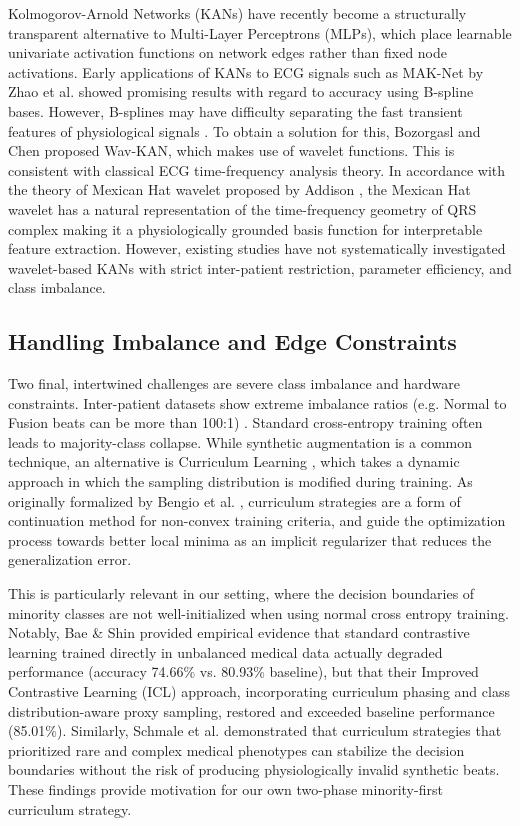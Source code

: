 \documentclass[final,5p,times,twocolumn,number]{elsarticle}
\begin{document}
Kolmogorov-Arnold Networks (KANs) \cite{liu_kan_2024} have recently become a structurally transparent alternative to Multi-Layer Perceptrons (MLPs), which place learnable univariate activation functions on network edges rather than fixed node activations. Early applications of KANs to ECG signals such as MAK-Net by Zhao et al. \cite{zhao_mak-net_2025} showed promising results with regard to accuracy using B-spline bases. However, B-splines may have difficulty separating the fast transient features of physiological signals \cite{bozorgasl_liu_2024}. To obtain a solution for this, Bozorgasl and Chen \cite{bozorgasl_liu_2024} proposed Wav-KAN, which makes use of wavelet functions. This is consistent with classical ECG time-frequency analysis theory. In accordance with the theory of Mexican Hat wavelet proposed by Addison \cite{addison_wavelet_2005}, the Mexican Hat wavelet has a natural representation of the time-frequency geometry of QRS complex making it a physiologically grounded basis function for interpretable feature extraction. However, existing studies have not systematically investigated wavelet-based KANs with strict inter-patient restriction, parameter efficiency, and class imbalance.

\subsection{Handling Imbalance and Edge Constraints}
Two final, intertwined challenges are severe class imbalance and hardware constraints. Inter-patient datasets show extreme imbalance ratios (e.g. Normal to Fusion beats can be more than 100:1) \cite{silva_systematic_2025}. Standard cross-entropy training often leads to majority-class collapse. While synthetic augmentation is a common technique, an alternative is Curriculum Learning \cite{bengio_curriculum_2009}, which takes a dynamic approach in which the sampling distribution is modified during training. As originally formalized by Bengio et al. \cite{bengio_curriculum_2009}, curriculum strategies are a form of continuation method for non-convex training criteria, and guide the optimization process towards better local minima as an implicit regularizer that reduces the generalization error.

This is particularly relevant in our setting, where the decision boundaries of minority classes are not well-initialized when using normal cross entropy training. Notably, Bae \& Shin \cite{bae_handling_2025} provided empirical evidence that standard contrastive learning trained directly in unbalanced medical data actually degraded performance (accuracy 74.66\% vs. 80.93\% baseline), but that their Improved Contrastive Learning (ICL) approach, incorporating curriculum phasing and class distribution-aware proxy sampling, restored and exceeded baseline performance (85.01\%). Similarly, Schmale et al. \cite{schmale_curriculum_2025} demonstrated that curriculum strategies that prioritized rare and complex medical phenotypes can stabilize the decision boundaries without the risk of producing physiologically invalid synthetic beats. These findings provide motivation for our own two-phase minority-first curriculum strategy.
\end{document}
